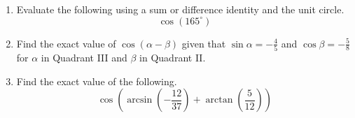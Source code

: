 


\begin{enumerate}
\item  Evaluate the following using a sum or difference identity and the unit circle.
$$\cos(165^\circ)$$

\vfill

\item  Find the exact value of $\cos (\alpha - \beta)$ given that $\sin \alpha = -\frac{4}{5}$ and $\cos \beta = -\frac{5}{8}$ for $\alpha$ in Quadrant III and $\beta$ in Quadrant II.
\vfill
\vfill


\newpage
\item  Find the exact value of the following.  $$\cos \left( \arcsin \left(-\frac{12}{37}\right)+\arctan \left(\frac{5}{12}\right)\right)$$
\vfill

\end{enumerate}




